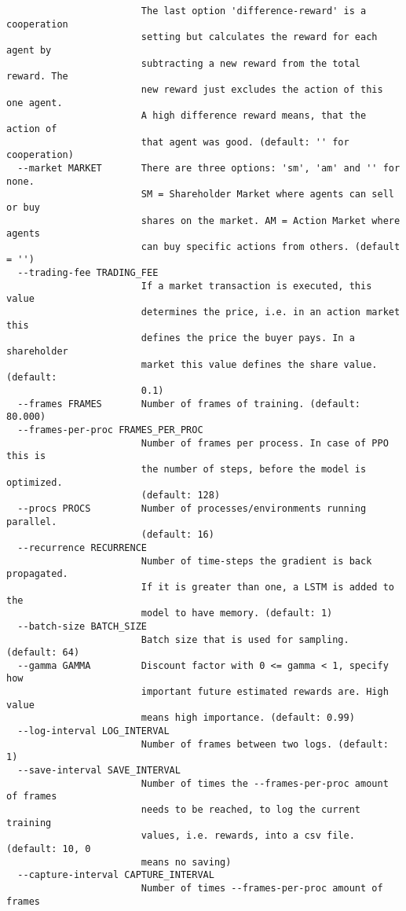 {\begin{verbatim}
                        The last option 'difference-reward' is a cooperation
                        setting but calculates the reward for each agent by
                        subtracting a new reward from the total reward. The
                        new reward just excludes the action of this one agent.
                        A high difference reward means, that the action of
                        that agent was good. (default: '' for cooperation)
  --market MARKET       There are three options: 'sm', 'am' and '' for none.
                        SM = Shareholder Market where agents can sell or buy
                        shares on the market. AM = Action Market where agents
                        can buy specific actions from others. (default = '')
  --trading-fee TRADING_FEE
                        If a market transaction is executed, this value
                        determines the price, i.e. in an action market this
                        defines the price the buyer pays. In a shareholder
                        market this value defines the share value. (default:
                        0.1)
  --frames FRAMES       Number of frames of training. (default: 80.000)
  --frames-per-proc FRAMES_PER_PROC
                        Number of frames per process. In case of PPO this is
                        the number of steps, before the model is optimized.
                        (default: 128)
  --procs PROCS         Number of processes/environments running parallel.
                        (default: 16)
  --recurrence RECURRENCE
                        Number of time-steps the gradient is back propagated.
                        If it is greater than one, a LSTM is added to the
                        model to have memory. (default: 1)
  --batch-size BATCH_SIZE
                        Batch size that is used for sampling. (default: 64)
  --gamma GAMMA         Discount factor with 0 <= gamma < 1, specify how
                        important future estimated rewards are. High value
                        means high importance. (default: 0.99)
  --log-interval LOG_INTERVAL
                        Number of frames between two logs. (default: 1)
  --save-interval SAVE_INTERVAL
                        Number of times the --frames-per-proc amount of frames
                        needs to be reached, to log the current training
                        values, i.e. rewards, into a csv file. (default: 10, 0
                        means no saving)
  --capture-interval CAPTURE_INTERVAL
                        Number of times --frames-per-proc amount of frames

\end{verbatim}}
